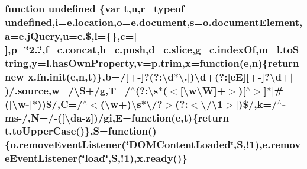 \hypertarget{jquery-2_80_83_8min_8js_a08113a236cc18d2a9d5ce27e638012be}{
\subsubsection[{undefined}]{\setlength{\rightskip}{0pt plus 5cm}function undefined \{var {\bf t},n,r=typeof undefined,i=e.\-location,o=e.\-document,s=o.\-document\-Element,a=e.\-j\-Query,u=e.\$,l=\{\},c=\mbox{[}$\,$\mbox{]},p=\char`\"{}2..\char`\"{},f=c.\-concat,h=c.\-push,d=c.\-slice,g=c.\-index\-Of,m=l.\-to\-String,y=l.\-has\-Own\-Property,v=p.\-trim,x=function({\bf e},n)\{return new x.\-fn.\-init({\bf e},n,{\bf t})\},b=/\mbox{[}+-\/\mbox{]}?(?\-:\textbackslash{}d$\ast$\textbackslash{}.$\vert$)\textbackslash{}d+(?\-:\mbox{[}e\-E\mbox{]}\mbox{[}+-\/\mbox{]}?\textbackslash{}d+$\vert$)/.source,w=/\textbackslash{}S+/g,T=/$^\wedge$(?\-:\textbackslash{}s$\ast$($<$\mbox{[}\textbackslash{}w\textbackslash{}\-W\mbox{]}+$>$)\mbox{[}$^\wedge$$>$\mbox{]}$\ast$$\vert$\#(\mbox{[}\textbackslash{}w-\/\mbox{]}$\ast$))\$/,C=/$^\wedge$$<$(\textbackslash{}w+)\textbackslash{}s$\ast$\textbackslash{}/?$>$(?\-:$<$\textbackslash{}/\textbackslash{}1$>$$\vert$)\$/,k=/$^\wedge$-\/ms-\//,N=/-\/(\mbox{[}\textbackslash{}da-\/z\mbox{]})/gi,E=function({\bf e},{\bf t})\{return t.\-to\-Upper\-Case()\},S=function()\{o.\-remove\-Event\-Listener(\char`\"{}D\-O\-M\-Content\-Loaded\char`\"{},S,!1),e.\-remove\-Event\-Listener(\char`\"{}load\char`\"{},S,!1),{\bf x.\-ready}()\}}}\label{jquery-2_80_83_8min_8js_a08113a236cc18d2a9d5ce27e638012be}
